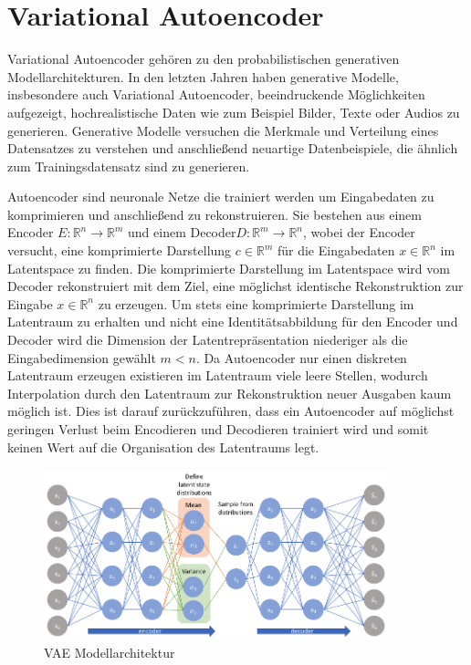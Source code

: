 \section{Variational Autoencoder}\raggedbottom
Variational Autoencoder \citep{kingma2014autoencoding} gehören zu den probabilistischen generativen Modellarchitekturen. In den letzten Jahren haben generative Modelle, insbesondere auch Variational Autoencoder, beeindruckende Möglichkeiten aufgezeigt, hochrealistische Daten wie zum Beispiel Bilder, Texte oder Audios zu generieren.
Generative Modelle versuchen die Merkmale und Verteilung eines Datensatzes zu verstehen und anschließend neuartige Datenbeispiele, die ähnlich zum Trainingsdatensatz sind zu generieren.

Autoencoder sind neuronale Netze die trainiert werden um Eingabedaten zu komprimieren und anschließend zu rekonstruieren. 
Sie bestehen aus einem Encoder $E:\mathbb{R}^n \rightarrow \mathbb{R}^m$ und einem Decoder$D:\mathbb{R}^m \rightarrow \mathbb{R}^n$, wobei der Encoder versucht, eine komprimierte Darstellung $c \in \mathbb{R}^{m}$ für die Eingabedaten $x \in \mathbb{R}^{n}$ im Latentspace zu finden. Die komprimierte Darstellung im Latentspace wird vom Decoder rekonstruiert mit dem Ziel, eine möglichst identische Rekonstruktion zur Eingabe $x \in \mathbb{R}^{n}$ zu erzeugen.
Um stets eine komprimierte Darstellung im Latentraum zu erhalten und nicht eine Identitätsabbildung für den Encoder und Decoder wird die Dimension der Latentrepräsentation niederiger als die Eingabedimension gewählt $m<n$. 
Da Autoencoder nur einen diskreten Latentraum erzeugen existieren im Latentraum viele leere Stellen, wodurch Interpolation durch den Latentraum zur Rekonstruktion neuer Ausgaben kaum möglich ist.
Dies ist darauf zurückzuführen, dass ein Autoencoder auf möglichst geringen Verlust beim Encodieren und Decodieren trainiert wird und somit keinen Wert auf die Organisation des Latentraums legt. 


\begin{figure}[h]
    \centering
    \includegraphics[width=10cm]{bilder/vae}
    \caption{VAE Modellarchitektur \citep{jordan_2018}}
    \label{vae_model}
\end{figure}


